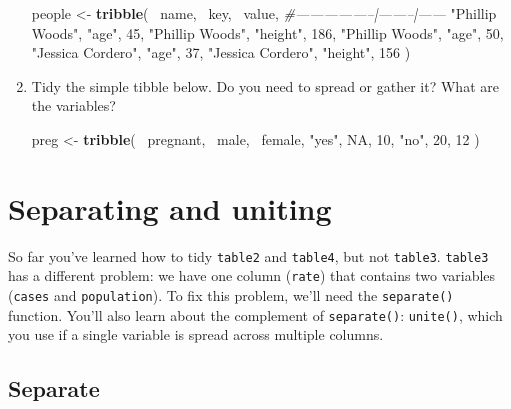 \documentclass[]{book}
\newenvironment{Shaded}{\begin{snugshade}}{\end{snugshade}}
\newcommand{\KeywordTok}[1]{\textcolor[rgb]{0.13,0.29,0.53}{\textbf{{#1}}}}
\newcommand{\DecValTok}[1]{\textcolor[rgb]{0.00,0.00,0.81}{{#1}}}
\newcommand{\StringTok}[1]{\textcolor[rgb]{0.31,0.60,0.02}{{#1}}}
\newcommand{\CommentTok}[1]{\textcolor[rgb]{0.56,0.35,0.01}{\textit{{#1}}}}
\newcommand{\OtherTok}[1]{\textcolor[rgb]{0.56,0.35,0.01}{{#1}}}
\newcommand{\NormalTok}[1]{{#1}}
\begin{document}
\begin{enumerate}
\begin{Shaded}
\begin{Highlighting}[]
\NormalTok{people <-}\StringTok{ }\KeywordTok{tribble}\NormalTok{(}
  \NormalTok{~name,             ~key,    ~value,}
  \CommentTok{#-----------------|--------|------}
  \StringTok{"Phillip Woods"}\NormalTok{,   }\StringTok{"age"}\NormalTok{,       }\DecValTok{45}\NormalTok{,}
  \StringTok{"Phillip Woods"}\NormalTok{,   }\StringTok{"height"}\NormalTok{,   }\DecValTok{186}\NormalTok{,}
  \StringTok{"Phillip Woods"}\NormalTok{,   }\StringTok{"age"}\NormalTok{,       }\DecValTok{50}\NormalTok{,}
  \StringTok{"Jessica Cordero"}\NormalTok{, }\StringTok{"age"}\NormalTok{,       }\DecValTok{37}\NormalTok{,}
  \StringTok{"Jessica Cordero"}\NormalTok{, }\StringTok{"height"}\NormalTok{,   }\DecValTok{156}
\NormalTok{)}
\end{Highlighting}
\end{Shaded}
\item
  Tidy the simple tibble below. Do you need to spread or gather it? What
  are the variables?

\begin{Shaded}
\begin{Highlighting}[]
\NormalTok{preg <-}\StringTok{ }\KeywordTok{tribble}\NormalTok{(}
  \NormalTok{~pregnant, ~male, ~female,}
  \StringTok{"yes"}\NormalTok{,     }\OtherTok{NA}\NormalTok{,    }\DecValTok{10}\NormalTok{,}
  \StringTok{"no"}\NormalTok{,      }\DecValTok{20}\NormalTok{,    }\DecValTok{12}
\NormalTok{)}
\end{Highlighting}
\end{Shaded}
\end{enumerate}

\section{Separating and uniting}\label{separating-and-uniting}

So far you've learned how to tidy \texttt{table2} and \texttt{table4},
but not \texttt{table3}. \texttt{table3} has a different problem: we
have one column (\texttt{rate}) that contains two variables
(\texttt{cases} and \texttt{population}). To fix this problem, we'll
need the \texttt{separate()} function. You'll also learn about the
complement of \texttt{separate()}: \texttt{unite()}, which you use if a
single variable is spread across multiple columns.

\subsection{Separate}\label{separate}
\end{document}
